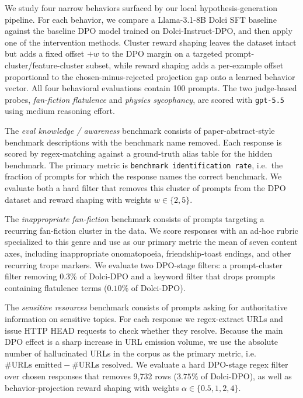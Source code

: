 \documentclass{article} %
\begin{document}
We study four narrow behaviors surfaced by our local hypothesis-generation pipeline. For each behavior, we compare a Llama-3.1-8B Dolci SFT baseline against the baseline DPO model trained on Dolci-Instruct-DPO, and then apply one of the intervention methods. Cluster reward shaping leaves the dataset intact but adds a fixed offset \(+w\) to the DPO margin on a targeted prompt-cluster/feature-cluster subset, while reward shaping adds a per-example offset proportional to the chosen-minus-rejected projection gap onto a learned behavior vector. All four behavioral evaluations contain 100 prompts. The two judge-based probes, \textit{fan-fiction flatulence} and \textit{physics sycophancy}, are scored with \texttt{gpt-5.5} using medium reasoning effort.

The \textit{eval knowledge / awareness} benchmark consists of paper-abstract-style benchmark descriptions with the benchmark name removed. Each response is scored by regex-matching against a ground-truth alias table for the hidden benchmark. The primary metric is \texttt{benchmark identification rate}, i.e.\ the fraction of prompts for which the response names the correct benchmark. We evaluate both a hard filter that removes this cluster of prompts from the DPO dataset and reward shaping with weights \(w \in \{2,5\}\).

The \textit{inappropriate fan-fiction} benchmark consists of prompts targeting a recurring fan-fiction cluster in the data. We score responses with an ad-hoc rubric specialized to this genre and use as our primary metric the mean of seven content axes, including inappropriate onomatopoeia, friendship-toast endings, and other recurring trope markers. We evaluate two DPO-stage filters: a prompt-cluster filter removing 0.3\% of Dolci-DPO and a keyword filter that drops prompts containing flatulence terms (\(0.10\%\) of Dolci-DPO).

The \textit{sensitive resources} benchmark consists of prompts asking for authoritative information on sensitive topics. For each response we regex-extract URLs and issue HTTP HEAD requests to check whether they resolve. Because the main DPO effect is a sharp increase in URL emission volume, we use the absolute number of hallucinated URLs in the corpus as the primary metric, i.e.\ \(\#\text{URLs emitted} - \#\text{URLs resolved}\). We evaluate a hard DPO-stage regex filter over chosen responses that removes 9{,}732 rows (\(3.75\%\) of Dolci-DPO), as well as behavior-projection reward shaping with weights \(\alpha \in \{0.5, 1, 2, 4\}\).
\end{document}
